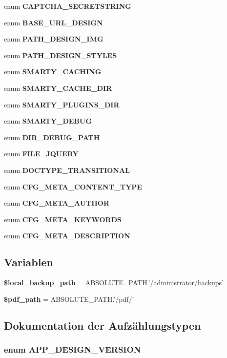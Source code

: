 \begin{CompactItemize}
enum {\bf CAPTCHA\_\-SECRETSTRING} 
\item 
enum {\bf BASE\_\-URL\_\-DESIGN} 
\item 
enum {\bf PATH\_\-DESIGN\_\-IMG} 
\item 
enum {\bf PATH\_\-DESIGN\_\-STYLES} 
\item 
enum {\bf SMARTY\_\-CACHING} 
\item 
enum {\bf SMARTY\_\-CACHE\_\-DIR} 
\item 
enum {\bf SMARTY\_\-PLUGINS\_\-DIR} 
\item 
enum {\bf SMARTY\_\-DEBUG} 
\item 
enum {\bf DIR\_\-DEBUG\_\-PATH} 
\item 
enum {\bf FILE\_\-JQUERY} 
\item 
enum {\bf DOCTYPE\_\-TRANSITIONAL} 
\item 
enum {\bf CFG\_\-META\_\-CONTENT\_\-TYPE} 
\item 
enum {\bf CFG\_\-META\_\-AUTHOR} 
\item 
enum {\bf CFG\_\-META\_\-KEYWORDS} 
\item 
enum {\bf CFG\_\-META\_\-DESCRIPTION} 
\end{CompactItemize}
\subsection*{Variablen}
\begin{CompactItemize}
\item 
{\bf \$local\_\-backup\_\-path} = ABSOLUTE\_\-PATH.'/administrator/backups'
\item 
{\bf \$pdf\_\-path} = ABSOLUTE\_\-PATH.'/pdf/'
\end{CompactItemize}


\subsection{Dokumentation der Aufzählungstypen}
\subsubsection{\setlength{\rightskip}{0pt plus 5cm}enum {\bf APP\_\-DESIGN\_\-VERSION}}\label{configuration_8php_270c48dec4d79f07aa7310fae0e58fa6}




